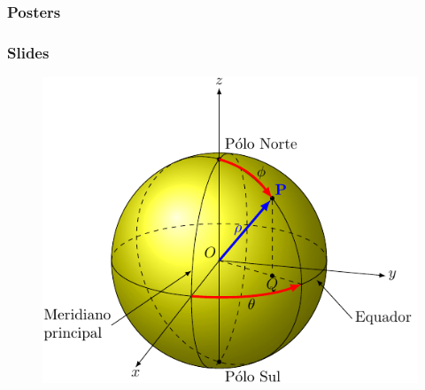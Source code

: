 \documentclass[aspectratio=169]{beamer}
\begin{document}
{%

  \begin{frame}\frametitle{Posters}
  \end{frame}
}

\begin{frame}\frametitle{Slides}
  \begin{figure}[h]
    \centering
    \includegraphics[height=0.6\paperheight]{img/slides}
  \end{figure}
\end{frame}
\end{document}
